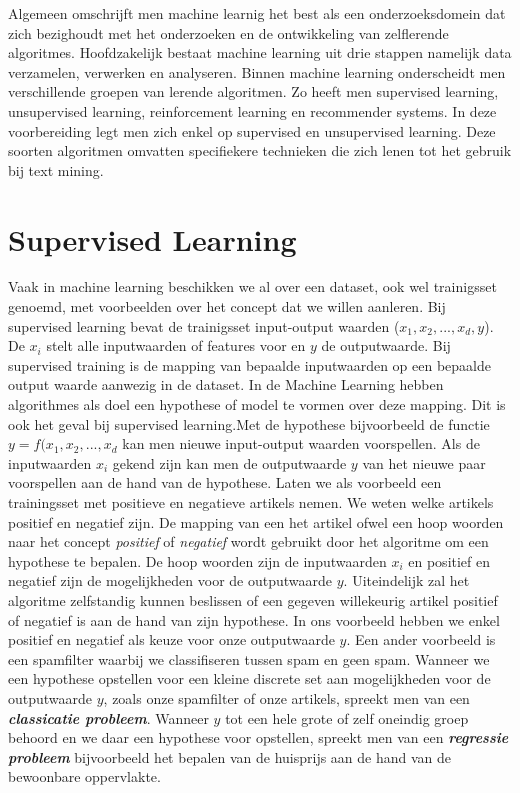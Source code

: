 Algemeen omschrijft men machine learnig het best als een onderzoeksdomein dat zich bezighoudt met het onderzoeken en de ontwikkeling van zelflerende algoritmes. Hoofdzakelijk bestaat machine learning uit drie stappen namelijk data verzamelen, verwerken en analyseren.
\newline
Binnen machine learning onderscheidt men verschillende groepen van lerende algoritmen. Zo heeft men supervised learning, unsupervised learning, reinforcement learning en recommender systems. In deze voorbereiding legt men zich enkel op supervised en unsupervised learning. Deze soorten algoritmen omvatten specifiekere technieken die zich lenen tot het gebruik bij text mining.


\section{Supervised Learning}\label{Supervised Learning}

Vaak in machine learning beschikken we al over een dataset, ook wel trainigsset genoemd, met voorbeelden over het concept dat we willen aanleren. Bij supervised learning bevat de trainigsset input-output waarden ($x_{1},x_{2},...,x_{d},y$). De $x_{i}$ stelt alle inputwaarden of features voor en $y$ de outputwaarde. Bij supervised training is de mapping van bepaalde inputwaarden op een bepaalde output waarde aanwezig in de dataset. In de Machine Learning hebben algorithmes als doel een hypothese of model te vormen over deze mapping. Dit is ook het geval bij supervised learning.Met de hypothese bijvoorbeeld de functie $y=f(x_{1},x_{2},...,x_{d}$ kan men nieuwe input-output waarden voorspellen. Als de inputwaarden $x_{i}$ gekend zijn kan men de outputwaarde $y$ van het nieuwe paar voorspellen aan de hand van de hypothese.  
\newline
Laten we als voorbeeld een trainingsset met positieve en negatieve artikels nemen. We weten welke artikels positief en negatief zijn. De mapping van een het artikel ofwel een hoop woorden naar het concept \textit{positief} of \textit{negatief} wordt gebruikt door het algoritme om een hypothese te bepalen. De hoop woorden zijn de inputwaarden $x_{i}$ en positief en negatief zijn de mogelijkheden voor de outputwaarde $y$. Uiteindelijk zal het algoritme zelfstandig kunnen beslissen of een gegeven willekeurig artikel positief of negatief is aan de hand van zijn hypothese.
\newline
In ons voorbeeld hebben we enkel positief en negatief als keuze voor onze outputwaarde $y$. Een ander voorbeeld is een spamfilter waarbij we classifiseren tussen spam en geen spam. Wanneer we een hypothese opstellen voor een kleine discrete set aan mogelijkheden voor de outputwaarde $y$, zoals onze spamfilter of onze artikels, spreekt men van een \textbf{\textit{classicatie probleem}}. Wanneer $y$ tot een hele grote of zelf oneindig groep behoord en we daar een hypothese voor opstellen, spreekt men van een \textbf{\textit{regressie probleem}} bijvoorbeeld het bepalen van de huisprijs aan de hand van de bewoonbare oppervlakte.

